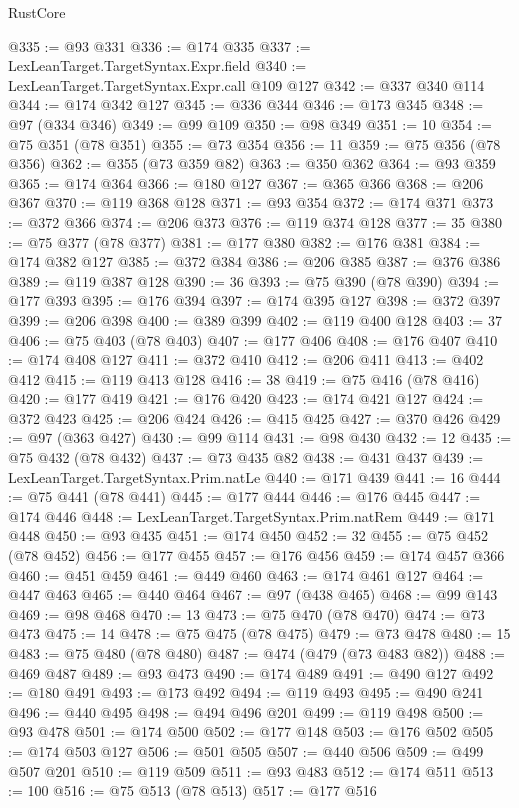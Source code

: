 \begin{lexlean}{RustCore}
\begin{coremodule}
@335 := @93 @331
@336 := @174 @335
@337 := LexLeanTarget.TargetSyntax.Expr.field
@340 := LexLeanTarget.TargetSyntax.Expr.call @109 @127
@342 := @337 @340 @114
@344 := @174 @342 @127
@345 := @336 @344
@346 := @173 @345
@348 := @97 (@334 @346)
@349 := @99 @109
@350 := @98 @349
@351 := 10
@354 := @75 @351 (@78 @351)
@355 := @73 @354
@356 := 11
@359 := @75 @356 (@78 @356)
@362 := @355 (@73 @359 @82)
@363 := @350 @362
@364 := @93 @359
@365 := @174 @364
@366 := @180 @127
@367 := @365 @366
@368 := @206 @367
@370 := @119 @368 @128
@371 := @93 @354
@372 := @174 @371
@373 := @372 @366
@374 := @206 @373
@376 := @119 @374 @128
@377 := 35
@380 := @75 @377 (@78 @377)
@381 := @177 @380
@382 := @176 @381
@384 := @174 @382 @127
@385 := @372 @384
@386 := @206 @385
@387 := @376 @386
@389 := @119 @387 @128
@390 := 36
@393 := @75 @390 (@78 @390)
@394 := @177 @393
@395 := @176 @394
@397 := @174 @395 @127
@398 := @372 @397
@399 := @206 @398
@400 := @389 @399
@402 := @119 @400 @128
@403 := 37
@406 := @75 @403 (@78 @403)
@407 := @177 @406
@408 := @176 @407
@410 := @174 @408 @127
@411 := @372 @410
@412 := @206 @411
@413 := @402 @412
@415 := @119 @413 @128
@416 := 38
@419 := @75 @416 (@78 @416)
@420 := @177 @419
@421 := @176 @420
@423 := @174 @421 @127
@424 := @372 @423
@425 := @206 @424
@426 := @415 @425
@427 := @370 @426
@429 := @97 (@363 @427)
@430 := @99 @114
@431 := @98 @430
@432 := 12
@435 := @75 @432 (@78 @432)
@437 := @73 @435 @82
@438 := @431 @437
@439 := LexLeanTarget.TargetSyntax.Prim.natLe
@440 := @171 @439
@441 := 16
@444 := @75 @441 (@78 @441)
@445 := @177 @444
@446 := @176 @445
@447 := @174 @446
@448 := LexLeanTarget.TargetSyntax.Prim.natRem
@449 := @171 @448
@450 := @93 @435
@451 := @174 @450
@452 := 32
@455 := @75 @452 (@78 @452)
@456 := @177 @455
@457 := @176 @456
@459 := @174 @457 @366
@460 := @451 @459
@461 := @449 @460
@463 := @174 @461 @127
@464 := @447 @463
@465 := @440 @464
@467 := @97 (@438 @465)
@468 := @99 @143
@469 := @98 @468
@470 := 13
@473 := @75 @470 (@78 @470)
@474 := @73 @473
@475 := 14
@478 := @75 @475 (@78 @475)
@479 := @73 @478
@480 := 15
@483 := @75 @480 (@78 @480)
@487 := @474 (@479 (@73 @483 @82))
@488 := @469 @487
@489 := @93 @473
@490 := @174 @489
@491 := @490 @127
@492 := @180 @491
@493 := @173 @492
@494 := @119 @493
@495 := @490 @241
@496 := @440 @495
@498 := @494 @496 @201
@499 := @119 @498
@500 := @93 @478
@501 := @174 @500
@502 := @177 @148
@503 := @176 @502
@505 := @174 @503 @127
@506 := @501 @505
@507 := @440 @506
@509 := @499 @507 @201
@510 := @119 @509
@511 := @93 @483
@512 := @174 @511
@513 := 100
@516 := @75 @513 (@78 @513)
@517 := @177 @516

\end{coremodule}
\end{lexlean}
